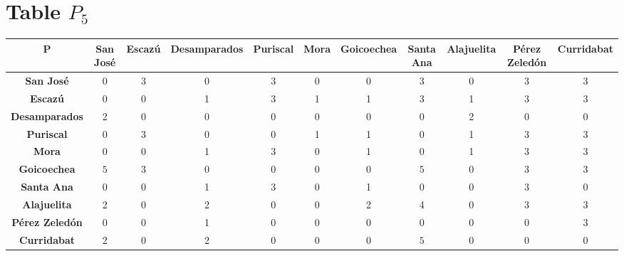 \documentclass{article}
\begin{document}
\section{Table $P_{5}$}
\begin{center}
    \begin{tabular}{|c||c|c|c|c|c|c|c|c|c|c|}
        \hline
        \textbf{P} & \textbf{San José} & \textbf{Escazú} & \textbf{Desamparados} & \textbf{Puriscal} & \textbf{Mora} & \textbf{Goicoechea} & \textbf{Santa Ana} & \textbf{Alajuelita} & \textbf{Pérez Zeledón} & \textbf{Curridabat} \\
        \hline
        \hline
        \textbf{San José}& 0 & 3 & 0 & 3 & 0 & 0 & 3 & 0 & 3 & 3 \\
        \hline
        \textbf{Escazú}& 0 & 0 & 1 & 3 & 1 & 1 & 3 & 1 & 3 & 3 \\
        \hline
        \textbf{Desamparados}& 2 & 0 & 0 & 0 & 0 & 0 & 0 & 2 & 0 & 0 \\
        \hline
        \textbf{Puriscal}& 0 & 3 & 0 & 0 & 1 & 1 & 0 & 1 & 3 & 3 \\
        \hline
        \textbf{Mora}& 0 & 0 & 1 & 3 & 0 & 1 & 0 & 1 & 3 & 3 \\
        \hline
        \textbf{Goicoechea}& \cellcolor[HTML]{D74894}$5$ & 3 & 0 & 0 & 0 & 0 & \cellcolor[HTML]{D74894}$5$ & 0 & 3 & 3 \\
        \hline
        \textbf{Santa Ana}& 0 & 0 & 1 & 3 & 0 & 1 & 0 & 0 & 3 & 0 \\
        \hline
        \textbf{Alajuelita}& 2 & 0 & 2 & 0 & 0 & 2 & 4 & 0 & 3 & 3 \\
        \hline
        \textbf{Pérez Zeledón}& 0 & 0 & 1 & 0 & 0 & 0 & 0 & 0 & 0 & 3 \\
        \hline
        \textbf{Curridabat}& 2 & 0 & 2 & 0 & 0 & 0 & \cellcolor[HTML]{D74894}$5$ & 0 & 0 & 0 \\
        \hline
    \end{tabular}
\end{center}
\end{document}
